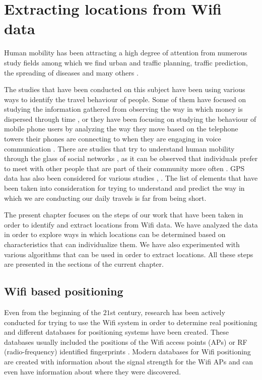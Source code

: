 \chapter{Extracting locations from Wifi data}
\label{locations}
Human mobility has been attracting a high degree of attention from numerous
study fields among which we find urban and traffic planning, traffic prediction,
the spreading of diseases and many others \cite{AsgariGB13} \cite{Brockmann08}.

The studies that have been conducted on this subject have been using various
ways to identify the travel behaviour of people. Some of them have focused on
studying the information gathered from observing the way in which money is
dispersed through time \cite{Brockmann06}, or they have been focusing on
studying the behaviour of mobile phone users by analyzing the way they move
based on the telephone towers their phones are connecting to when they are
engaging in voice communication \cite{Barabasi08}. There are studies that try to
understand human mobility through the glass of social networks
\cite{yang2010using}, as it can be observed that individuals prefer to meet with
other people that are part of their community more often
\cite{Musolesi:2007:DMM:1317425.1317433}. GPS data has also been considered for
various studies \cite{cuttone2014inferring}, \cite{5657695}. The list of
elements that have been taken into consideration for trying to understand and
predict the way in which we are conducting our daily travels is far from being
short.

The present chapter focuses on the steps of our work that have been taken in
order to identify and extract locations from Wifi data. We have analyzed the
data in order to explore ways in which locations can be determined based on
characteristics that can individualize them. We have also experimented with
various algorithms that can be used in order to extract locations. All these
steps are presented in the sections of the current chapter.

\section{Wifi based positioning}

Even from the beginning of the $21$st century, research has been actively
conducted for trying to use the Wifi system in order to determine real
positioning and different databases for positioning systems have been created.
These databases usually included the positions of the Wifi access points (APs)
or RF (radio-frequency) identified fingerprints
\cite{Chen:2006:PMP:2166283.2166297} \cite{Cheng:2005:ACM:1067170.1067195}
\cite{Youssef:2005:HWL:1067170.1067193} \cite{bahl2000radar}. Modern databases
for Wifi positioning are created with information about the signal strength for
the Wifi APs and can even have information about where they were discovered.

